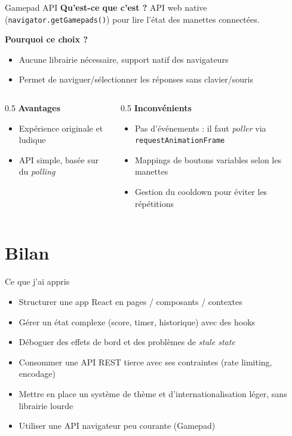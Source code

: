 \documentclass[aspectratio=169]{beamer}
\begin{document}
\begin{frame}{Gamepad API}
  \textbf{Qu'est-ce que c'est ?} API web native (\texttt{navigator.getGamepads()}) pour lire l'état des manettes connectées.

  \vspace{0.3cm}
  \textbf{Pourquoi ce choix ?}
  \begin{itemize}
    \item Aucune librairie nécessaire, support natif des navigateurs
    \item Permet de naviguer/sélectionner les réponses sans clavier/souris
  \end{itemize}

  \vspace{0.3cm}
  \begin{columns}
    \begin{column}{0.5\textwidth}
      \textbf{Avantages}
      \begin{itemize}
        \item Expérience originale et ludique
        \item API simple, basée sur du \textit{polling}
      \end{itemize}
    \end{column}
    \begin{column}{0.5\textwidth}
      \textbf{Inconvénients}
      \begin{itemize}
        \item Pas d'événements : il faut \textit{poller} via \texttt{requestAnimationFrame}
        \item Mappings de boutons variables selon les manettes
        \item Gestion du \og cooldown \fg{} pour éviter les répétitions
      \end{itemize}
    \end{column}
  \end{columns}
\end{frame}

\section{Bilan}

\begin{frame}{Ce que j'ai appris}
  \begin{itemize}
    \item Structurer une app React en pages / composants / contextes
    \item Gérer un état complexe (score, timer, historique) avec des hooks
    \item Déboguer des effets de bord et des problèmes de \textit{stale state}
    \item Consommer une API REST tierce avec ses contraintes (rate limiting, encodage)
    \item Mettre en place un système de thème et d'internationalisation léger, sans librairie lourde
    \item Utiliser une API navigateur peu courante (Gamepad)
  \end{itemize}
\end{frame}
\end{document}
